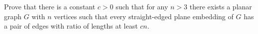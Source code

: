 Prove that there is a constant $c>0$ such that for any $n>3$ there exists a planar graph $G$ with $n$ vertices such that every straight-edged plane embedding of $G$ has a pair of edges with ratio of lengths at least $cn$.